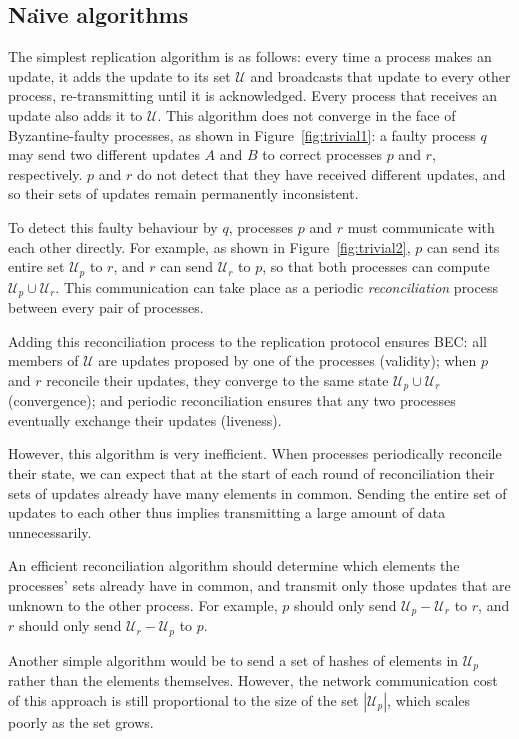 \documentclass[a4paper,anonymous,USenglish]{lipics-v2019}
\begin{document}
\subsection{Na\"{\i}ve algorithms}

The simplest replication algorithm is as follows: every time a process makes an update, it adds the update to its set $\mathcal{U}$ and broadcasts that update to every other process, re-transmitting until it is acknowledged.
Every process that receives an update also adds it to $\mathcal{U}$.
This algorithm does not converge in the face of Byzantine-faulty processes, as shown in Figure~\ref{fig:trivial1}: a faulty process $q$ may send two different updates $A$ and $B$ to correct processes $p$ and $r$, respectively.
$p$ and $r$ do not detect that they have received different updates, and so their sets of updates remain permanently inconsistent.

To detect this faulty behaviour by $q$, processes $p$ and $r$ must communicate with each other directly.
For example, as shown in Figure~\ref{fig:trivial2}, $p$ can send its entire set $\mathcal{U}_p$ to $r$, and $r$ can send $\mathcal{U}_r$ to $p$, so that both processes can compute $\mathcal{U}_p \cup \mathcal{U}_r$.
This communication can take place as a periodic \emph{reconciliation} process between every pair of processes.

Adding this reconciliation process to the replication protocol ensures BEC: all members of $\mathcal{U}$ are updates proposed by one of the processes (validity); when $p$ and $r$ reconcile their updates, they converge to the same state $\mathcal{U}_p \cup \mathcal{U}_r$ (convergence); and periodic reconciliation ensures that any two processes eventually exchange their updates (liveness).

However, this algorithm is very inefficient.
When processes periodically reconcile their state, we can expect that at the start of each round of reconciliation their sets of updates already have many elements in common.
Sending the entire set of updates to each other thus implies transmitting a large amount of data unnecessarily.

An efficient reconciliation algorithm should determine which elements the processes' sets already have in common, and transmit only those updates that are unknown to the other process.
For example, $p$ should only send $\mathcal{U}_p - \mathcal{U}_r$ to $r$, and $r$ should only send $\mathcal{U}_r - \mathcal{U}_p$ to $p$.

Another simple algorithm would be to send a set of hashes of elements in $\mathcal{U}_p$ rather than the elements themselves.
However, the network communication cost of this approach is still proportional to the size of the set $|\mathcal{U}_p|$, which scales poorly as the set grows.
\end{document}
